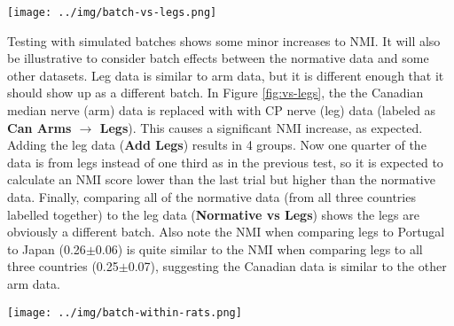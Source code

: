 \documentclass[12pt]{article}
\begin{document}
\pagebreak

\begin{figure*}
  \centering
       \texttt{[image: ../img/batch-vs-legs.png]}
         \caption{}
  \label{fig:vs-legs}
\end{figure*}

Testing with simulated batches shows some minor increases to NMI. It will also be illustrative to consider batch effects between the normative data and some other datasets. Leg data is similar to arm data, but it is different enough that it should show up as a different batch. In Figure \ref{fig:vs-legs}, the the Canadian median nerve (arm) data is replaced with with CP nerve (leg) data (labeled as \textbf{Can Arms $\rightarrow$ Legs}). This causes a significant NMI increase, as expected. Adding the leg data (\textbf{Add Legs}) results in 4 groups. Now one quarter of the data is from legs instead of one third as in the previous test, so it is expected to calculate an NMI score lower than the last trial but higher than the normative data. Finally, comparing all of the normative data (from all three countries labelled together) to the leg data (\textbf{Normative vs Legs}) shows the legs are obviously a different batch. Also note the NMI when comparing legs to Portugal to Japan (0.26$\pm$0.06) is quite similar to the NMI when comparing legs to all three countries  (0.25$\pm$0.07), suggesting the Canadian data is similar to the other arm data.

\pagebreak

\begin{figure*}
  \centering
       \texttt{[image: ../img/batch-within-rats.png]}
         \caption{}
  \label{fig:within-rats}
\end{figure*}
\end{document}
